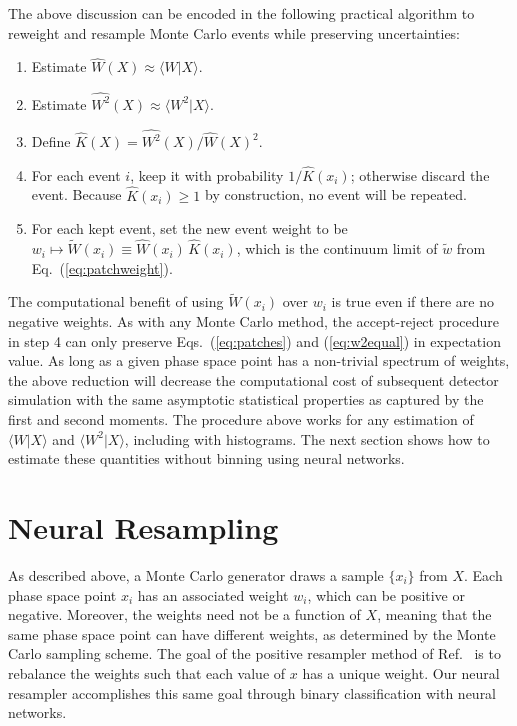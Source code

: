 \documentclass[prd,twocolumn,superscriptaddress,longbibliography,preprintnumbers,floatfix,nofootinbib]{revtex4-1}
\DeclareRobustCommand{\Eq}[1]{Eq.~(\ref{eq:#1})}
\DeclareRobustCommand{\Eqs}[2]{Eqs.~(\ref{eq:#1}) and (\ref{eq:#2})}
\DeclareRobustCommand{\Ref}[1]{Ref.~\cite{#1}}
\begin{document}
The above discussion can be encoded in the following practical algorithm to reweight and resample Monte Carlo events while preserving uncertainties:
%
\begin{enumerate}
\item Estimate $\widehat{W}(X)\approx \langle W|X\rangle$.
\item Estimate $\widehat{W^2}(X)\approx \langle W^2|X\rangle$.
\item Define $\widehat{K}(X)=\widehat{W^2}(X)/\widehat{W}(X)^2$.
\item For each event $i$, keep it with probability $1/\widehat{K}(x_i)$; otherwise discard the event.  Because $\widehat{K}(x_i) \ge 1$ by construction, no event will be repeated.
\item For each kept event, set the new event weight to be $w_i\mapsto \widetilde{W}(x_i)\equiv \widehat{W}(x_i)\, \widehat{K}(x_i)$, which is the continuum limit of $\widetilde{w}$ from \Eq{patchweight}.
\end{enumerate}
%
The computational benefit of using $\widetilde{W}(x_i)$ over $w_i$ is true even if there are no negative weights.
%
As with any Monte Carlo method, the accept-reject procedure in step 4 can only preserve \Eqs{patches}{w2equal} in expectation value.
%
As long as a given phase space point has a non-trivial spectrum of weights, the above reduction will decrease the computational cost of subsequent detector simulation with the same asymptotic statistical properties as captured by the first and second moments.  The procedure above works for any estimation of $\langle W|X\rangle$ and $\langle W^2|X\rangle$, including with histograms.  The next section shows how to estimate these quantities without binning using neural networks.

\section{Neural Resampling}
\label{sec:methods}

As described above, a Monte Carlo generator draws a sample $\{x_i\}$ from $X$.
%
Each phase space point $x_i$ has an associated weight $w_i$, which can be positive or negative.
%
Moreover, the weights need not be a function of $X$, meaning that the same phase space point can have different weights, as determined by the Monte Carlo sampling scheme.
%
The goal of the positive resampler method of \Ref{andersen2020positive} is to rebalance the weights such that each value of $x$ has a unique weight.
%
Our neural resampler accomplishes this same goal through binary classification with neural networks.
\end{document}
